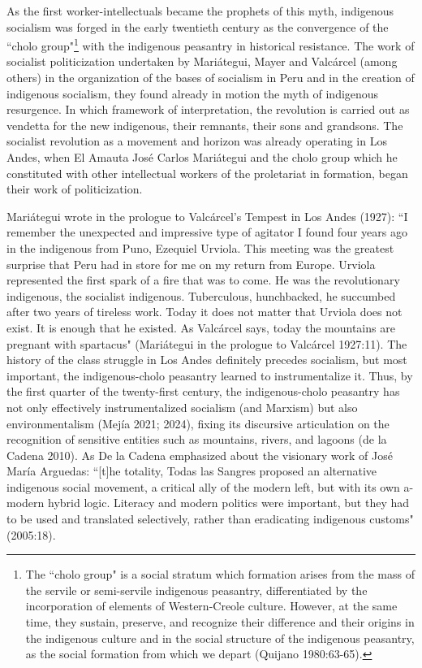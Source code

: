\documentclass[]{interact}
\theoremstyle{plain}%
\theoremstyle{definition}
\theoremstyle{remark}
\begin{document}
As the first worker-intellectuals became the prophets of this myth, indigenous socialism was forged in the early twentieth century as the convergence of the “cholo group"\footnote{The “cholo group" is a social stratum which formation arises from the mass of the servile or semi-servile indigenous peasantry, differentiated by the incorporation of elements of Western-Creole culture. However, at the same time, they sustain, preserve, and recognize their difference and their origins in the indigenous culture and in the social structure of the indigenous peasantry, as the social formation from which we depart (Quijano 1980:63-65).} with the indigenous peasantry in historical resistance. The work of socialist politicization undertaken by Mariátegui, Mayer and Valcárcel (among others) in the organization of the bases of socialism in Peru and in the creation of indigenous socialism, they found already in motion the myth of indigenous resurgence. In which framework of interpretation, the revolution is carried out as vendetta for the new indigenous, their remnants, their sons and grandsons. The socialist revolution as a movement and horizon was already operating in Los Andes, when El Amauta José Carlos Mariátegui and the cholo group which he constituted with other intellectual workers of the proletariat in formation, began their work of politicization.

Mariátegui wrote in the prologue to Valcárcel's Tempest in Los Andes (1927): “I remember the unexpected and impressive type of agitator I found four years ago in the indigenous from Puno, Ezequiel Urviola. This meeting was the greatest surprise that Peru had in store for me on my return from Europe. Urviola represented the first spark of a fire that was to come. He was the revolutionary indigenous, the socialist indigenous. Tuberculous, hunchbacked, he succumbed after two years of tireless work. Today it does not matter that Urviola does not exist. It is enough that he existed. As Valcárcel says, today the mountains are pregnant with spartacus" (Mariátegui in the prologue to Valcárcel 1927:11).
The history of the class struggle in Los Andes definitely precedes socialism, but most important, the indigenous-cholo peasantry learned to instrumentalize it. Thus, by the first quarter of the twenty-first century, the indigenous-cholo peasantry has not only effectively instrumentalized socialism (and Marxism) but also environmentalism (Mejía 2021; 2024), fixing its discursive articulation on the recognition of sensitive entities such as mountains, rivers, and lagoons (de la Cadena 2010). As De la Cadena emphasized about the visionary work of José María Arguedas: “[t]he totality, Todas las Sangres proposed an alternative indigenous social movement, a critical ally of the modern left, but with its own a-modern hybrid logic. Literacy and modern politics were important, but they had to be used and translated selectively, rather than eradicating indigenous customs" (2005:18).
\end{document}
